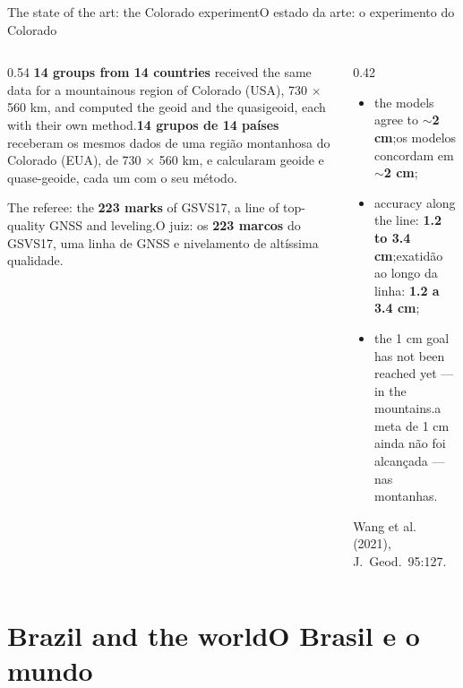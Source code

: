 \documentclass[aspectratio=169,11pt]{beamer}
\newcommand{\tr}[2]{\ifEN#2\else#1\fi}
\newcommand{\bnum}[1]{\textbf{\textcolor{mTeal}{#1}}}
\begin{document}
\begin{frame}{\tr{O estado da arte: o experimento do Colorado}{The state of the art: the
  Colorado experiment}}
  \begin{columns}[T]
    \begin{column}{0.54\textwidth}
      \tr{\bnum{14 grupos de 14 países} receberam os mesmos dados de uma região montanhosa do
      Colorado (EUA), de 730 $\times$ 560 km, e calcularam geoide e quase-geoide, cada um com
      o seu método.}{\bnum{14 groups from 14 countries} received the same data for a
      mountainous region of Colorado (USA), 730 $\times$ 560 km, and computed the geoid and
      the quasigeoid, each with their own method.}
      \medskip

      \tr{O juiz: os \bnum{223 marcos} do GSVS17, uma linha de GNSS e nivelamento de altíssima
      qualidade.}{The referee: the \bnum{223 marks} of GSVS17, a line of top-quality GNSS and
      leveling.}
    \end{column}
    \begin{column}{0.42\textwidth}
      \begin{ideia}[title={\tr{O que saiu}{What came out}}]
        \begin{itemize}
          \item \tr{os modelos concordam em \bnum{$\sim$2 cm};}{the models agree to
                \bnum{$\sim$2 cm};}
          \item \tr{exatidão ao longo da linha: \bnum{\num{1.2} a \num{3.4} cm};}{accuracy along
                the line: \bnum{\num{1.2} to \num{3.4} cm};}
          \item \tr{a meta de \alert{1 cm} ainda não foi alcançada --- nas montanhas.}{the
                \alert{1 cm} goal has not been reached yet --- in the mountains.}
        \end{itemize}
      \end{ideia}
      {\scriptsize\textcolor{mStoneMid}{Wang et al. (2021), J.~Geod.~95:127.}}
    \end{column}
  \end{columns}
\end{frame}

\section{\tr{O Brasil e o mundo}{Brazil and the world}}
\end{document}
